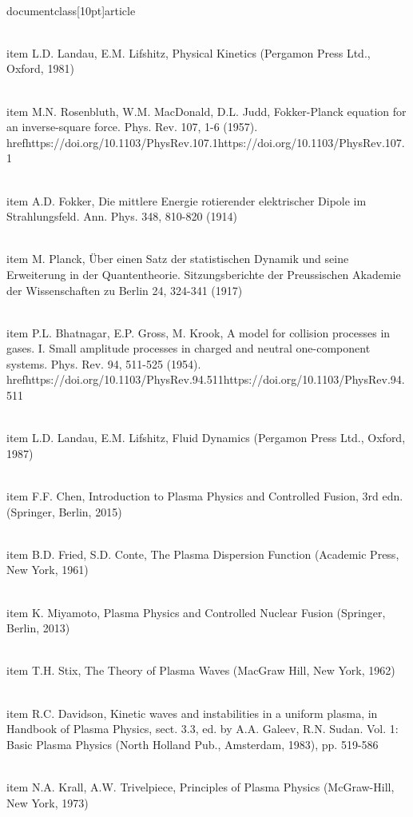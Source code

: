 \\documentclass[10pt]{article}
\begin{document}
{{{{  \\item L.D. Landau, E.M. Lifshitz, Physical Kinetics (Pergamon Press Ltd., Oxford, 1981)

  \\item M.N. Rosenbluth, W.M. MacDonald, D.L. Judd, Fokker-Planck equation for an inverse-square force. Phys. Rev. 107, 1-6 (1957). \\href{https://doi.org/10.1103/PhysRev.107.1}{https://doi.org/10.1103/PhysRev.107.1}

  \\item A.D. Fokker, Die mittlere Energie rotierender elektrischer Dipole im Strahlungsfeld. Ann. Phys. 348, 810-820 (1914)

  \\item M. Planck, Über einen Satz der statistischen Dynamik und seine Erweiterung in der Quantentheorie. Sitzungsberichte der Preussischen Akademie der Wissenschaften zu Berlin 24, 324-341 (1917)

  \\item P.L. Bhatnagar, E.P. Gross, M. Krook, A model for collision processes in gases. I. Small amplitude processes in charged and neutral one-component systems. Phys. Rev. 94, 511-525 (1954). \\href{https://doi.org/10.1103/PhysRev.94.511}{https://doi.org/10.1103/PhysRev.94.511}

  \\item L.D. Landau, E.M. Lifshitz, Fluid Dynamics (Pergamon Press Ltd., Oxford, 1987)

  \\item F.F. Chen, Introduction to Plasma Physics and Controlled Fusion, 3rd edn. (Springer, Berlin, 2015)

  \\item B.D. Fried, S.D. Conte, The Plasma Dispersion Function (Academic Press, New York, 1961)

  \\item K. Miyamoto, Plasma Physics and Controlled Nuclear Fusion (Springer, Berlin, 2013)

  \\item T.H. Stix, The Theory of Plasma Waves (MacGraw Hill, New York, 1962)

  \\item R.C. Davidson, Kinetic waves and instabilities in a uniform plasma, in Handbook of Plasma Physics, sect. 3.3, ed. by A.A. Galeev, R.N. Sudan. Vol. 1: Basic Plasma Physics (North Holland Pub., Amsterdam, 1983), pp. 519-586

  \\item N.A. Krall, A.W. Trivelpiece, Principles of Plasma Physics (McGraw-Hill, New York, 1973)

}}}}
\end{document}
